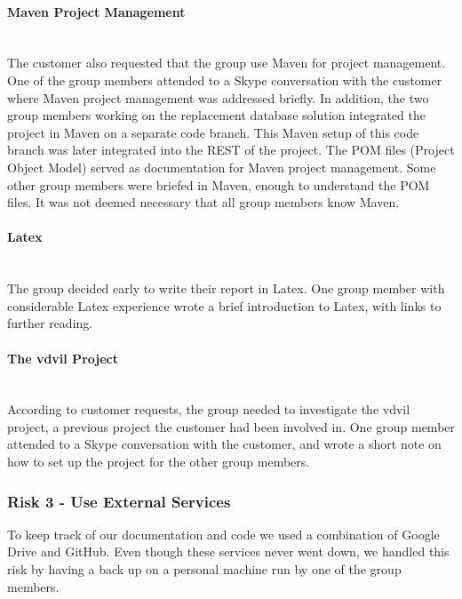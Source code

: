 \documentclass[../document]{subfiles}
\begin{document}
\paragraph{Maven Project Management} \ \\
The customer also requested that the group use Maven for project management. One of the group members attended to a Skype conversation with the customer where Maven project management was addressed briefly. In addition, the two group members working on the replacement database solution integrated the project in Maven on a separate code branch. This Maven setup of this code branch was later integrated into the \gls{REST} of the project. The POM files (Project Object Model) served as documentation for Maven project management. Some other group members were briefed in Maven, enough to understand the POM files. It was not deemed necessary that all group members know Maven.

\paragraph{Latex} \ \\
The group decided early to write their report in Latex. One group member with considerable Latex experience wrote a brief introduction to Latex, with links to further reading.

\paragraph{The vdvil Project} \ \\
According to customer requests, the group needed to investigate the vdvil project, a previous project the customer had been involved in. One group member attended to a Skype conversation with the customer, and wrote a short note on how to set up the project for the other group members.


\subsubsection{Risk 3 - Use External Services}
To keep track of our documentation and code we used a combination of Google Drive and GitHub. Even though these services never went down, we handled this risk by having a back up on a personal machine run by one of the group members. 
\end{document}
